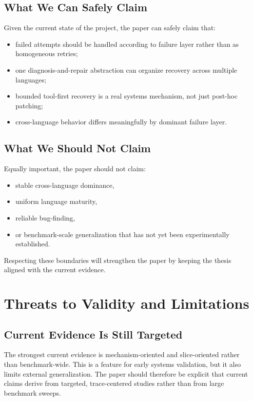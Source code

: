 \documentclass[10pt]{article}
\begin{document}
\subsection{What We Can Safely Claim}

Given the current state of the project, the paper can safely claim that:

\begin{itemize}[leftmargin=1.4em]
    \item failed attempts should be handled according to failure layer rather than as homogeneous retries;
    \item one diagnosis-and-repair abstraction can organize recovery across multiple languages;
    \item bounded tool-first recovery is a real systems mechanism, not just post-hoc patching;
    \item cross-language behavior differs meaningfully by dominant failure layer.
\end{itemize}

\subsection{What We Should Not Claim}

Equally important, the paper should not claim:

\begin{itemize}[leftmargin=1.4em]
    \item stable cross-language dominance,
    \item uniform language maturity,
    \item reliable bug-finding,
    \item or benchmark-scale generalization that has not yet been experimentally established.
\end{itemize}

Respecting these boundaries will strengthen the paper by keeping the thesis aligned with the current evidence.

\section{Threats to Validity and Limitations}
\label{sec:threats}

\subsection{Current Evidence Is Still Targeted}

The strongest current evidence is mechanism-oriented and slice-oriented rather than benchmark-wide. This is a feature for early systems validation, but it also limits external generalization. The paper should therefore be explicit that current claims derive from targeted, trace-centered studies rather than from large benchmark sweeps.
\end{document}
